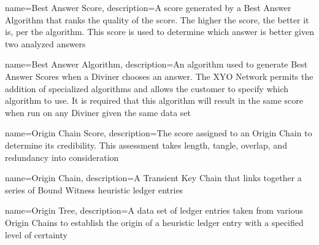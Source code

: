 \documentclass{article}
\begin{document}
{
    name={Best Answer Score},
    description={A score generated by a Best Answer Algorithm that ranks the quality of the score.  The higher the score, the better it is, per the algorithm.  This score is used to determine which answer is better given two analyzed answers}
}

{
    name={Best Answer Algorithm},
    description={An algorithm used to generate Best Answer Scores when a Diviner chooses an answer.  The XYO Network permits the addition of specialized algorithms and allows the customer to specify which algorithm to use.  It is required that this algorithm will result in the same score when run on any Diviner given the same data set}
}

{
    name={Origin Chain Score},
    description={The score assigned to an Origin Chain to determine its credibility. This assessment takes length, tangle, overlap, and redundancy into consideration}
}

{
    name={Origin Chain},
    description={A Transient Key Chain that links together a series of Bound Witness heuristic ledger entries}
}

{
    name={Origin Tree},
    description={A data set of ledger entries taken from various Origin Chains to establish the origin of a heuristic ledger entry with a specified level of certainty}
}




\printglossaries

\end{document}

